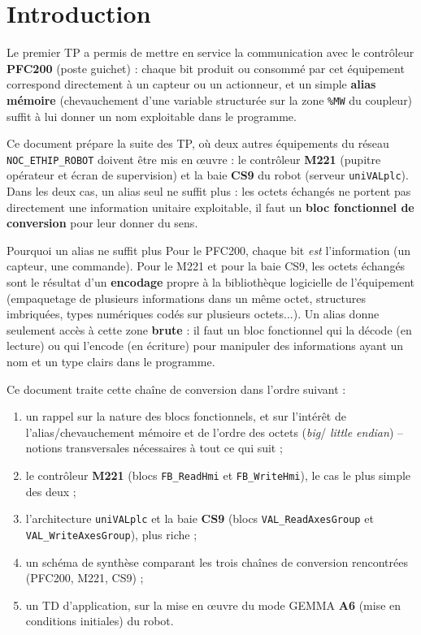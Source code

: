 \section{Introduction}
\label{secIntroductionChaine}

Le premier TP a permis de mettre en service la communication avec le
contrôleur \textbf{PFC200} (poste guichet) : chaque bit produit ou
consommé par cet équipement correspond directement à un capteur ou un
actionneur, et un simple \textbf{alias mémoire} (chevauchement d'une
variable structurée sur la zone \texttt{\%MW} du coupleur) suffit à lui
donner un nom exploitable dans le programme.

Ce document prépare la suite des TP, où deux autres équipements du réseau
\texttt{NOC\_ETHIP\_ROBOT} doivent être mis en œuvre : le contrôleur
\textbf{M221} (pupitre opérateur et écran de supervision) et la baie
\textbf{CS9} du robot (serveur \texttt{uniVALplc}). Dans les deux cas, un
alias seul ne suffit plus : les octets échangés ne portent pas
directement une information unitaire exploitable, il faut un
\textbf{bloc fonctionnel de conversion} pour leur donner du sens.

\begin{UPSTIinfor}{Pourquoi un alias ne suffit plus}
Pour le PFC200, chaque bit \emph{est} l'information (un capteur, une
commande). Pour le M221 et pour la baie CS9, les octets échangés sont le
résultat d'un \textbf{encodage} propre à la bibliothèque logicielle de
l'équipement (empaquetage de plusieurs informations dans un même octet,
structures imbriquées, types numériques codés sur plusieurs octets...).
Un alias donne seulement accès à cette zone \textbf{brute} : il faut un
bloc fonctionnel qui la décode (en lecture) ou qui l'encode (en écriture)
pour manipuler des informations ayant un nom et un type clairs dans le
programme.
\end{UPSTIinfor}

Ce document traite cette chaîne de conversion dans l'ordre suivant :

\begin{enumerate}
    \item un rappel sur la nature des blocs fonctionnels, et sur l'intérêt
    de l'alias/chevauchement mémoire et de l'ordre des octets (\emph{big}/
    \emph{little endian}) -- notions transversales nécessaires à tout ce
    qui suit ;
    \item le contrôleur \textbf{M221} (blocs \texttt{FB\_ReadHmi} et
    \texttt{FB\_WriteHmi}), le cas le plus simple des deux ;
    \item l'architecture \texttt{uniVALplc} et la baie \textbf{CS9}
    (blocs \texttt{VAL\_ReadAxesGroup} et \texttt{VAL\_WriteAxesGroup}),
    plus riche ;
    \item un schéma de synthèse comparant les trois chaînes de conversion
    rencontrées (PFC200, M221, CS9) ;
    \item un TD d'application, sur la mise en œuvre du mode GEMMA
    \textbf{A6} (mise en conditions initiales) du robot.
\end{enumerate}
